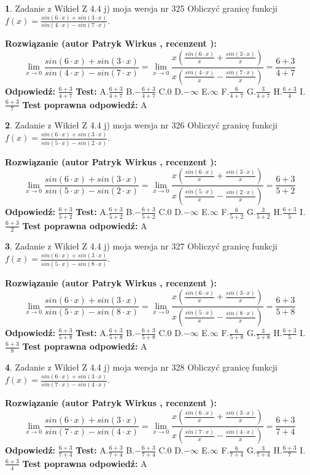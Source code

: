 \documentclass[12pt, a4paper]{article}
\theoremstyle{definition} %
\newtheorem{zad}{}
\newcommand{\zadStart}[1]{\begin{zad}#1\newline}
\newcommand{\zadStop}{\end{zad}}
\newcommand{\rozwStart}[2]{\noindent \textbf{Rozwiązanie (autor #1 , recenzent #2): }\newline}
\newcommand{\rozwStop}{\newline}
\newcommand{\odpStart}{\noindent \textbf{Odpowiedź:}\newline}
\newcommand{\odpStop}{\newline}
\newcommand{\testStart}{\noindent \textbf{Test:}\newline}
\newcommand{\testStop}{\newline}
\newcommand{\kluczStart}{\noindent \textbf{Test poprawna odpowiedź:}\newline}
\newcommand{\kluczStop}{\newline}
\begin{document}
\zadStart{Zadanie z Wikieł Z 4.4 j) moja wersja nr 325}
Obliczyć granicę funkcji $f(x)=\frac{sin(6\cdot x) +sin(3\cdot x)}{sin(4\cdot x) -sin(7\cdot x)}$.
\zadStop
\rozwStart{Patryk Wirkus}{}
$$\lim\limits_{x\to 0}\frac{sin(6\cdot x) +sin(3\cdot x)}{sin(4\cdot x) -sin(7\cdot x)}=\lim\limits_{x\to 0}\frac{x(\frac{sin(6\cdot x)}{x}+\frac{sin(3\cdot x)}{x})}{x(\frac{sin(4\cdot x)}{x}-\frac{sin(7\cdot x)}{x})}=\frac{6+3}{4+7}$$
\rozwStop
\odpStart
$\frac{6+3}{4+7}$
\odpStop
\testStart
A.$\frac{6+3}{4+7}$
B.$-\frac{6+3}{4+7}$
C.$0$
D.$-\infty$
E.$\infty$
F.$\frac{6}{4+7}$
G.$\frac{3}{4+7}$
H.$\frac{6+3}{4}$
I.$\frac{6+3}{7}$
\testStop
\kluczStart
A
\kluczStop



\zadStart{Zadanie z Wikieł Z 4.4 j) moja wersja nr 326}
Obliczyć granicę funkcji $f(x)=\frac{sin(6\cdot x) +sin(3\cdot x)}{sin(5\cdot x) -sin(2\cdot x)}$.
\zadStop
\rozwStart{Patryk Wirkus}{}
$$\lim\limits_{x\to 0}\frac{sin(6\cdot x) +sin(3\cdot x)}{sin(5\cdot x) -sin(2\cdot x)}=\lim\limits_{x\to 0}\frac{x(\frac{sin(6\cdot x)}{x}+\frac{sin(3\cdot x)}{x})}{x(\frac{sin(5\cdot x)}{x}-\frac{sin(2\cdot x)}{x})}=\frac{6+3}{5+2}$$
\rozwStop
\odpStart
$\frac{6+3}{5+2}$
\odpStop
\testStart
A.$\frac{6+3}{5+2}$
B.$-\frac{6+3}{5+2}$
C.$0$
D.$-\infty$
E.$\infty$
F.$\frac{6}{5+2}$
G.$\frac{3}{5+2}$
H.$\frac{6+3}{5}$
I.$\frac{6+3}{2}$
\testStop
\kluczStart
A
\kluczStop



\zadStart{Zadanie z Wikieł Z 4.4 j) moja wersja nr 327}
Obliczyć granicę funkcji $f(x)=\frac{sin(6\cdot x) +sin(3\cdot x)}{sin(5\cdot x) -sin(8\cdot x)}$.
\zadStop
\rozwStart{Patryk Wirkus}{}
$$\lim\limits_{x\to 0}\frac{sin(6\cdot x) +sin(3\cdot x)}{sin(5\cdot x) -sin(8\cdot x)}=\lim\limits_{x\to 0}\frac{x(\frac{sin(6\cdot x)}{x}+\frac{sin(3\cdot x)}{x})}{x(\frac{sin(5\cdot x)}{x}-\frac{sin(8\cdot x)}{x})}=\frac{6+3}{5+8}$$
\rozwStop
\odpStart
$\frac{6+3}{5+8}$
\odpStop
\testStart
A.$\frac{6+3}{5+8}$
B.$-\frac{6+3}{5+8}$
C.$0$
D.$-\infty$
E.$\infty$
F.$\frac{6}{5+8}$
G.$\frac{3}{5+8}$
H.$\frac{6+3}{5}$
I.$\frac{6+3}{8}$
\testStop
\kluczStart
A
\kluczStop



\zadStart{Zadanie z Wikieł Z 4.4 j) moja wersja nr 328}
Obliczyć granicę funkcji $f(x)=\frac{sin(6\cdot x) +sin(3\cdot x)}{sin(7\cdot x) -sin(4\cdot x)}$.
\zadStop
\rozwStart{Patryk Wirkus}{}
$$\lim\limits_{x\to 0}\frac{sin(6\cdot x) +sin(3\cdot x)}{sin(7\cdot x) -sin(4\cdot x)}=\lim\limits_{x\to 0}\frac{x(\frac{sin(6\cdot x)}{x}+\frac{sin(3\cdot x)}{x})}{x(\frac{sin(7\cdot x)}{x}-\frac{sin(4\cdot x)}{x})}=\frac{6+3}{7+4}$$
\rozwStop
\odpStart
$\frac{6+3}{7+4}$
\odpStop
\testStart
A.$\frac{6+3}{7+4}$
B.$-\frac{6+3}{7+4}$
C.$0$
D.$-\infty$
E.$\infty$
F.$\frac{6}{7+4}$
G.$\frac{3}{7+4}$
H.$\frac{6+3}{7}$
I.$\frac{6+3}{4}$
\testStop
\kluczStart
A
\kluczStop
\end{document}
